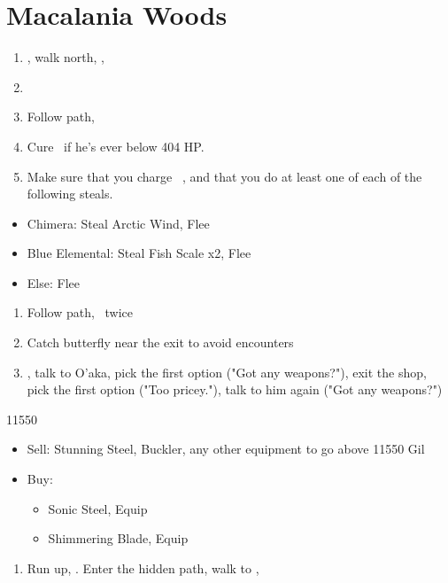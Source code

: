 \chapter{Macalania Woods}

\begin{enumerate}
	\item \sd, walk north, \sd, \save
	\item \formation{\tidus}{\rikku}{\auron}
	\item Follow path, 
	\item Cure \tidus\ if he's ever below 404 HP.
	\item Make sure that you charge \rikku\ \od, and that you do at least one of each of the following steals.
\end{enumerate}
\begin{encounters}
	\begin{itemize}
		\item Chimera: Steal Arctic Wind, Flee
		\item Blue Elemental: Steal Fish Scale x2, Flee
		\item Else: Flee
	\end{itemize}
\end{encounters}
\begin{enumerate}[resume]
	\item Follow path, \sd\ twice
	\item Catch butterfly near the exit to avoid encounters
	\formation{\tidus}{\yuna}{\kimahri}
	\item \save, talk to O'aka, pick the first option ("Got any weapons?"), exit the shop, pick the first option ("Too pricey."), talk to him again ("Got any weapons?")
\end{enumerate}
\begin{shop}{11550}
	\begin{itemize}
		\item Sell: Stunning Steel, Buckler, any other equipment to go above 11550 Gil
		\item Buy:
			\begin{itemize}
				\item Sonic Steel, Equip
				\item Shimmering Blade, Equip
			\end{itemize}
	\end{itemize}
\end{shop}
\begin{enumerate}[resume]
	\item Run up, \sd. Enter the hidden path, walk to \auron, \sd
\end{enumerate}
